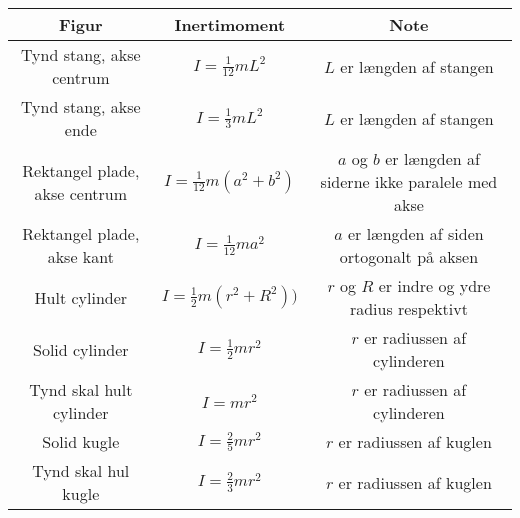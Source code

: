 \begin{tabular}{|c|c|c|}
	\hline
	Figur&Inertimoment&Note\\
	\hline
	Tynd stang, akse centrum&$I=\frac{1}{12}mL^2$&$L$ er længden af stangen\\
	Tynd stang, akse ende&$I=\frac{1}{3}mL^2$&$L$ er længden af stangen\\
	Rektangel plade, akse centrum&$I=\frac{1}{12}m(a^2+b^2)$&$a$ og $b$ er længden af siderne ikke paralele med akse\\
	Rektangel plade, akse kant&$I=\frac{1}{12}ma^2$&$a$ er længden af siden ortogonalt på aksen\\
	Hult cylinder&$I=\frac{1}{2}m(r^2+R^2))$&$r$ og $R$ er indre og ydre radius respektivt\\
	Solid cylinder&$I=\frac{1}{2}mr^2$&$r$ er radiussen af cylinderen\\
	Tynd skal hult cylinder&$I=mr^2$&$r$ er radiussen af cylinderen\\
	Solid kugle&$I=\frac{2}{5}mr^2$&$r$ er radiussen af kuglen\\
	Tynd skal hul kugle&$I=\frac{2}{3}mr^2$&$r$ er radiussen af kuglen\\
	\hline
\end{tabular}